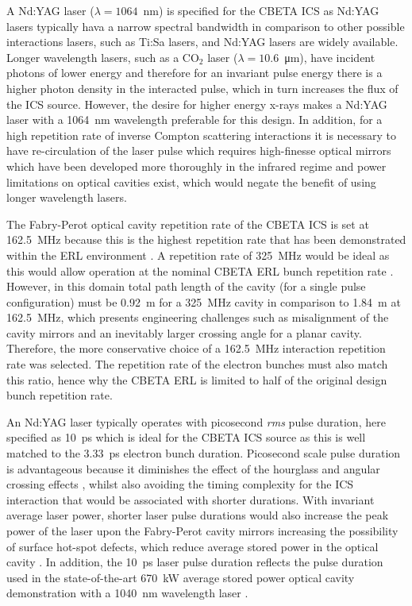 \documentclass[../main.tex]{subfiles}
\begin{document}
A Nd:YAG laser ($\lambda = 1064$~\si{\nano\meter}) is specified for the CBETA ICS as Nd:YAG lasers typically hava a narrow spectral bandwidth in comparison to other possible interactions lasers, such as Ti:Sa lasers, and Nd:YAG lasers are widely available. Longer wavelength lasers, such as a CO$_{2}$ laser \cite{pogorelsky2020converting} ($\lambda = 10.6$~\si{\micro\meter}), have incident photons of lower energy and therefore for an invariant pulse energy there is a higher photon density in the interacted pulse, which in turn increases the flux of the ICS source. However, the desire for higher energy x-rays makes a Nd:YAG laser with a 1064~\si{\nano\meter} wavelength preferable for this design. In addition, for a high repetition rate of inverse Compton scattering interactions it is necessary to have re-circulation of the laser pulse which requires high-finesse optical mirrors which have been developed more thoroughly in the infrared regime and power limitations on optical cavities exist, which would negate the benefit of using longer wavelength lasers. 

The Fabry-Perot optical cavity repetition rate of the CBETA ICS is set at 162.5~\si{\mega\hertz} because this is the highest repetition rate that has been demonstrated within the ERL environment \cite{akagi2016narrow}. A repetition rate of 325~\si{\mega\hertz} would be ideal as this would allow operation at the nominal CBETA ERL bunch repetition rate \cite{hoffstaetter2017cbeta}. However, in this domain total path length of the cavity (for a single pulse configuration) must be 0.92~\si{\meter} for a 325~\si{\mega\hertz} cavity in comparison to 1.84~\si{\meter} at 162.5~\si{\mega\hertz}, which presents engineering challenges such as misalignment of the cavity mirrors and an inevitably larger crossing angle for a planar cavity. Therefore, the more conservative choice of a 162.5~\si{\mega\hertz} interaction repetition rate was selected. The repetition rate of the electron bunches must also match this ratio, hence why the CBETA ERL is limited to half of the original design bunch repetition rate. 

An Nd:YAG laser typically operates with picosecond \textit{rms} pulse duration, here specified as 10~\si{\pico\second} which is ideal for the CBETA ICS source as this is well matched to the 3.33~\si{\pico\second} electron bunch duration. Picosecond scale pulse duration is advantageous because it diminishes the effect of the hourglass and angular crossing effects \cite{miyahara2008luminosity}, whilst also avoiding the timing complexity for the ICS interaction that would be associated with shorter durations. With invariant average laser power, shorter laser pulse durations would also increase the peak power of the laser upon the Fabry-Perot cavity mirrors increasing the possibility of surface hot-spot defects, which reduce average stored power in the optical cavity \cite{wang2020prior}. In addition, the 10~\si{\pico\second} laser pulse duration reflects the pulse duration used in the state-of-the-art 670~\si{\kilo\watt} average stored power optical cavity demonstration with a 1040~\si{\nano\meter} wavelength laser \cite{carstens2014megawatt}.     
\end{document}
